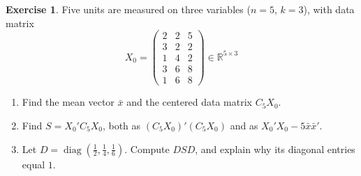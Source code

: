 \documentclass[12pt]{article}
\newcommand{\R}{\mathbb R}
\DeclareMathOperator{\diag}{diag}
\theoremstyle{definition}
\newtheorem{exercise}{Exercise}
\begin{document}
\begin{exercise}\label{r1-ex-data-five}
Five units are measured on three variables (\(n=5\), \(k=3\)), with data matrix
\[
X_0=\begin{pmatrix}2&2&5\\3&2&2\\1&4&2\\3&6&8\\1&6&8\end{pmatrix}\in\R^{5\times3}
\]
\begin{enumerate}
\item Find the mean vector \(\bar x\) and the centered data matrix \(C_5X_0\).
\item Find \(S=X_0'C_5X_0\), both as \((C_5X_0)'(C_5X_0)\) and as
\(X_0'X_0-5\bar x\bar x'\).
\item Let \(D=\diag(\frac12,\frac14,\frac16)\). Compute \(DSD\), and explain why its diagonal
entries equal \(1\).
\end{enumerate}
\end{exercise}
\end{document}
